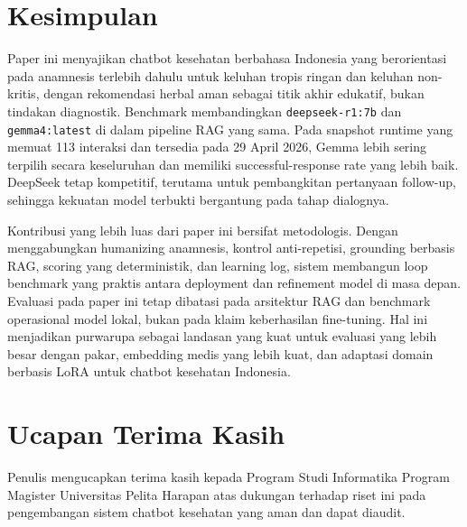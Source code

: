 \documentclass[conference]{IEEEtran}
\begin{document}
\section{Kesimpulan}
Paper ini menyajikan chatbot kesehatan berbahasa Indonesia yang berorientasi pada anamnesis terlebih dahulu untuk keluhan tropis ringan dan keluhan non-kritis, dengan rekomendasi herbal aman sebagai titik akhir edukatif, bukan tindakan diagnostik. Benchmark membandingkan \texttt{deepseek-r1:7b} dan \texttt{gemma4:latest} di dalam pipeline RAG yang sama. Pada snapshot runtime yang memuat 113 interaksi dan tersedia pada 29 April 2026, Gemma lebih sering terpilih secara keseluruhan dan memiliki successful-response rate yang lebih baik. DeepSeek tetap kompetitif, terutama untuk pembangkitan pertanyaan follow-up, sehingga kekuatan model terbukti bergantung pada tahap dialognya.

Kontribusi yang lebih luas dari paper ini bersifat metodologis. Dengan menggabungkan humanizing anamnesis, kontrol anti-repetisi, grounding berbasis RAG, scoring yang deterministik, dan learning log, sistem membangun loop benchmark yang praktis antara deployment dan refinement model di masa depan. Evaluasi pada paper ini tetap dibatasi pada arsitektur RAG dan benchmark operasional model lokal, bukan pada klaim keberhasilan fine-tuning. Hal ini menjadikan purwarupa sebagai landasan yang kuat untuk evaluasi yang lebih besar dengan pakar, embedding medis yang lebih kuat, dan adaptasi domain berbasis LoRA untuk chatbot kesehatan Indonesia.

\section*{Ucapan Terima Kasih}
Penulis mengucapkan terima kasih kepada Program Studi Informatika Program Magister Universitas Pelita Harapan atas dukungan terhadap riset ini pada pengembangan sistem chatbot kesehatan yang aman dan dapat diaudit.
\end{document}
